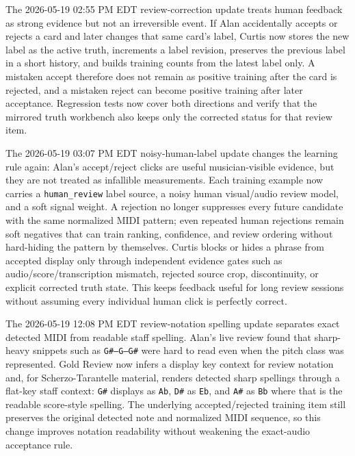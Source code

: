 \documentclass[12pt,letterpaper]{article}
\begin{document}
The 2026-05-19 02:55 PM EDT review-correction update treats human feedback as strong evidence but not an irreversible event. If Alan accidentally accepts or rejects a card and later changes that same card's label, Curtis now stores the new label as the active truth, increments a label revision, preserves the previous label in a short history, and builds training counts from the latest label only. A mistaken accept therefore does not remain as positive training after the card is rejected, and a mistaken reject can become positive training after later acceptance. Regression tests now cover both directions and verify that the mirrored truth workbench also keeps only the corrected status for that review item.

The 2026-05-19 03:07 PM EDT noisy-human-label update changes the learning rule again: Alan's accept/reject clicks are useful musician-visible evidence, but they are not treated as infallible measurements. Each training example now carries a \texttt{human\_review} label source, a noisy human visual/audio review model, and a soft signal weight. A rejection no longer suppresses every future candidate with the same normalized MIDI pattern; even repeated human rejections remain soft negatives that can train ranking, confidence, and review ordering without hard-hiding the pattern by themselves. Curtis blocks or hides a phrase from accepted display only through independent evidence gates such as audio/score/transcription mismatch, rejected source crop, discontinuity, or explicit corrected truth state. This keeps feedback useful for long review sessions without assuming every individual human click is perfectly correct.

The 2026-05-19 12:08 PM EDT review-notation spelling update separates exact detected MIDI from readable staff spelling. Alan's live review found that sharp-heavy snippets such as \texttt{G\#--G--G\#} were hard to read even when the pitch class was represented. Gold Review now infers a display key context for review notation and, for Scherzo-Tarantelle material, renders detected sharp spellings through a flat-key staff context: \texttt{G\#} displays as \texttt{Ab}, \texttt{D\#} as \texttt{Eb}, and \texttt{A\#} as \texttt{Bb} where that is the readable score-style spelling. The underlying accepted/rejected training item still preserves the original detected note and normalized MIDI sequence, so this change improves notation readability without weakening the exact-audio acceptance rule.
\end{document}
